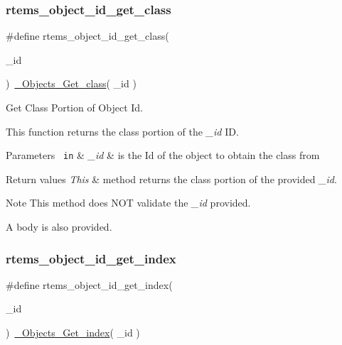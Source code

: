 \subsubsection{\texorpdfstring{rtems\_object\_id\_get\_class}{rtems\_object\_id\_get\_class}}
{\footnotesize\ttfamily \#define rtems\+\_\+object\+\_\+id\+\_\+get\+\_\+class(\begin{DoxyParamCaption}\item[{}]{\+\_\+id }\end{DoxyParamCaption})~\mbox{\hyperlink{group__RTEMSScoreObject_ga450c379424f26235d60f702638d229fa}{\+\_\+\+Objects\+\_\+\+Get\+\_\+class}}( \+\_\+id )}



Get Class Portion of Object Id. 

This function returns the class portion of the {\itshape \+\_\+id} ID.


\begin{DoxyParams}[1]{Parameters}
\mbox{\texttt{ in}}  & {\em \+\_\+id} & is the Id of the object to obtain the class from\\
\hline
\end{DoxyParams}

\begin{DoxyRetVals}{Return values}
{\em This} & method returns the class portion of the provided {\itshape \+\_\+id}.\\
\hline
\end{DoxyRetVals}
\begin{DoxyNote}{Note}
This method does N\+OT validate the {\itshape \+\_\+id} provided.

A body is also provided. 
\end{DoxyNote}
\mbox{\label{group__ClassicClassInfo_ga3a392f8dd107326289aecdf1543f0d94}} 
\subsubsection{\texorpdfstring{rtems\_object\_id\_get\_index}{rtems\_object\_id\_get\_index}}
{\footnotesize\ttfamily \#define rtems\+\_\+object\+\_\+id\+\_\+get\+\_\+index(\begin{DoxyParamCaption}\item[{}]{\+\_\+id }\end{DoxyParamCaption})~\mbox{\hyperlink{group__RTEMSScoreObject_ga22cdf45f285840b7728b06197a7f4627}{\+\_\+\+Objects\+\_\+\+Get\+\_\+index}}( \+\_\+id )}



